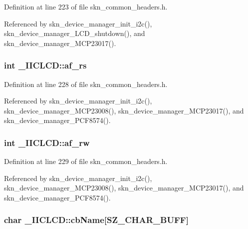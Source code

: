 Definition at line 223 of file skn\+\_\+common\+\_\+headers.\+h.



Referenced by skn\+\_\+device\+\_\+manager\+\_\+init\+\_\+i2c(), skn\+\_\+device\+\_\+manager\+\_\+\+L\+C\+D\+\_\+shutdown(), and skn\+\_\+device\+\_\+manager\+\_\+\+M\+C\+P23017().

\hypertarget{struct___i_i_c_l_c_d_af738bf1e020daaa5476b917c375e807a}{
\subsubsection[{af\+\_\+rs}]{\setlength{\rightskip}{0pt plus 5cm}int \+\_\+\+I\+I\+C\+L\+C\+D\+::af\+\_\+rs}}\label{struct___i_i_c_l_c_d_af738bf1e020daaa5476b917c375e807a}


Definition at line 228 of file skn\+\_\+common\+\_\+headers.\+h.



Referenced by skn\+\_\+device\+\_\+manager\+\_\+init\+\_\+i2c(), skn\+\_\+device\+\_\+manager\+\_\+\+M\+C\+P23008(), skn\+\_\+device\+\_\+manager\+\_\+\+M\+C\+P23017(), and skn\+\_\+device\+\_\+manager\+\_\+\+P\+C\+F8574().

\hypertarget{struct___i_i_c_l_c_d_ad0162f6a3e82c34192c0d901ef0ff6be}{
\subsubsection[{af\+\_\+rw}]{\setlength{\rightskip}{0pt plus 5cm}int \+\_\+\+I\+I\+C\+L\+C\+D\+::af\+\_\+rw}}\label{struct___i_i_c_l_c_d_ad0162f6a3e82c34192c0d901ef0ff6be}


Definition at line 229 of file skn\+\_\+common\+\_\+headers.\+h.



Referenced by skn\+\_\+device\+\_\+manager\+\_\+init\+\_\+i2c(), skn\+\_\+device\+\_\+manager\+\_\+\+M\+C\+P23008(), skn\+\_\+device\+\_\+manager\+\_\+\+M\+C\+P23017(), and skn\+\_\+device\+\_\+manager\+\_\+\+P\+C\+F8574().

\hypertarget{struct___i_i_c_l_c_d_a3f9347595482a6da5cb5d536d937a554}{
\subsubsection[{cb\+Name}]{\setlength{\rightskip}{0pt plus 5cm}char \+\_\+\+I\+I\+C\+L\+C\+D\+::cb\+Name\mbox{[}{\bf S\+Z\+\_\+\+C\+H\+A\+R\+\_\+\+B\+U\+F\+F}\mbox{]}}}\label{struct___i_i_c_l_c_d_a3f9347595482a6da5cb5d536d937a554}


